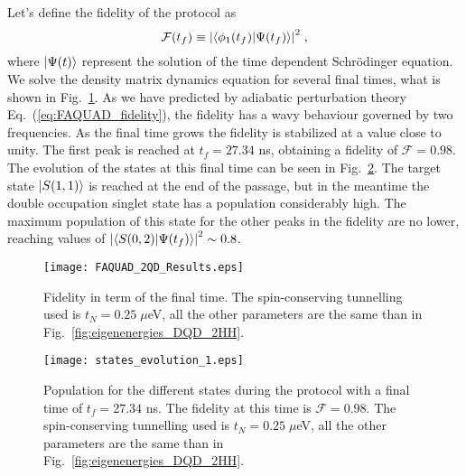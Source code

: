 Let's define the fidelity of the protocol as
\begin{equation}
	\mathcal{F}(t_f)\equiv \abs{\braket{\phi_1(t_f)}{\Psi(t_f)}}^2\; ,
\end{equation}
where $\ket{\Psi(t)}$ represent the solution of the time dependent Schrödinger equation. We solve the density matrix dynamics equation for several final times, what is shown in Fig.~\ref{fig:FAQUAD_2QD_Results}. As we have predicted by adiabatic perturbation theory Eq.~(\ref{eq:FAQUAD_fidelity}), the fidelity has a wavy behaviour governed by two frequencies. As the final time grows the fidelity is stabilized at a value close to unity. The first peak is reached at $t_f=27.34$ ns, obtaining a fidelity of $\mathcal{F}=0.98$. The evolution of the states at this final time can be seen in Fig.~\ref{fig:states_evolution_1}. The target state $\ket{S(1,1)}$ is reached at the end of the passage, but in the meantime the double occupation singlet state has a population considerably high. The maximum population of this state for the other peaks in the fidelity are no lower, reaching values of $\abs{\braket{S(0,2)}{\Psi(t_f)}}^2\sim 0.8$.\\
\begin{figure}[!htb]
	\centering
	\texttt{[image: FAQUAD\_2QD\_Results.eps]}
	\caption{Fidelity in term of the final time. The spin-conserving tunnelling used is $t_N=0.25\; \mu$eV, all the other parameters are the same than in Fig.~\ref{fig:eigenenergies_DQD_2HH}.}
	\label{fig:FAQUAD_2QD_Results}
\end{figure}
\begin{figure}[!htb]
	\centering
	\texttt{[image: states\_evolution\_1.eps]}
	\caption{Population for the different states during the protocol with a final time of $t_f=27.34$ ns. The fidelity at this time is $\mathcal{F}=0.98$. The spin-conserving tunnelling used is $t_N=0.25\; \mu$eV, all the other parameters are the same than in Fig.~\ref{fig:eigenenergies_DQD_2HH}.}
	\label{fig:states_evolution_1}
\end{figure}

